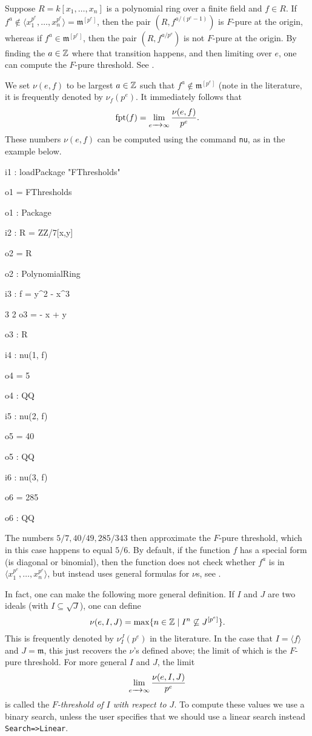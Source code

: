\documentclass{amsart}
\newcommand{\fram}{\mathfrak{m}}
\begin{document}
Suppose $R = k[x_1, \dots, x_n]$ is a polynomial ring over a finite field and $f \in R$.    If $f^a \notin \langle x_1^{p^e}, \dots, x_n^{p^e} \rangle = \fram^{[p^e]}$, then the pair $(R, f^{a/(p^e -1)})$ is $F$-pure at the origin, whereas if $f^a \in \fram^{[p^e]}$, then the pair $(R, f^{a/p^e})$ is not $F$-pure at the origin.  By finding the $a \in \bZ$ where that transition happens, and then limiting over $e$, one can compute the $F$-pure threshold.  See \cite{MustataTakagiWatanabeFThresholdsAndBernsteinSato}.

We set $\nu(e, f)$ to be largest $a \in \bZ$ such that $f^a \notin \fram^{[p^e]}$ (note in the literature, it is frequently denoted by $\nu_f(p^e)$.  It immediately follows that 
\[
\fpt(f) = \lim_{e \to \infty} {\nu(e, f) \over p^e}.
\]
These numbers $\nu(e, f)$ can be computed using the command {\tt nu}, as in the example below.  
\medskip
{\small
{}
\begin{MyVerbatim}
i1 : loadPackage "FThresholds"

o1 = FThresholds

o1 : Package

i2 : R = ZZ/7[x,y]

o2 = R

o2 : PolynomialRing

i3 : f = y^2 - x^3

        3    2
o3 = - x  + y

o3 : R

i4 : nu(1, f)

o4 = 5

o4 : QQ

i5 : nu(2, f)

o5 = 40

o5 : QQ

i6 : nu(3, f)

o6 = 285

o6 : QQ
\end{MyVerbatim}
}
\medskip
The numbers $5/7, 40/49, 285/343$ then approximate the $F$-pure threshold, which in this case happens to equal $5/6$.  By default, if the function $f$ has a special form (is diagonal or binomial), then the function does not check whether $f^a$ is in  $\langle x_1^{p^e}, \dots, x_n^{p^e} \rangle$, but instead uses general formulas for $\nu$s, see \cite{HernandezFPureThresholdOfBinomial,HernandezFInvariantsOfDiagonalHyp}.

In fact, one can make the following more general definition.  If $I$ and $J$ are two ideals (with $I \subseteq \sqrt{J}$), one can define
\[
\nu(e, I, J) = \max \{ n \in \bZ \; |\; I^n \not\subseteq J^{[p^e]} \}.
\]
This is frequently denoted by $\nu_I^J(p^e)$ in the literature.  In the case that $I = \langle f \rangle$ and $J = \fram$, this just recovers the $\nu$'s defined above; the limit of which is the $F$-pure threshold.  For more general $I$ and $J$, the limit
\[
\lim_{e \to \infty} {\nu(e, I, J) \over p^e}
\]
is called the \emph{$F$-threshold of $I$ with respect to $J$}.  To compute these values we use a binary search, unless the user specifies that we should use a linear search instead {\tt Search=>Linear}.  
\end{document}
